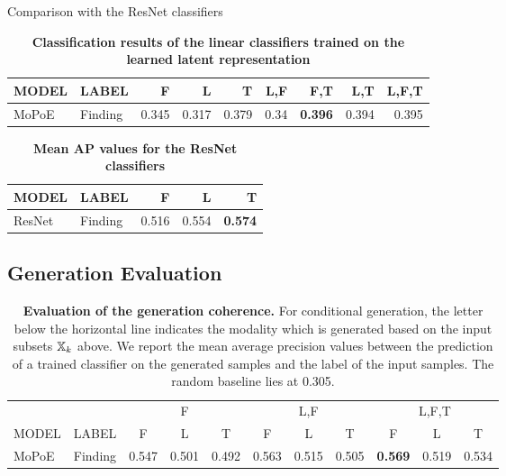     \begin{frame}{Comparison with the ResNet classifiers}
            \begin{table}
                \centering
            \begin{tabular}{llrrrrrrr}
            MODEL & LABEL &      F &      L &      T &   L,F &    F,T &    L,T &  L,F,T \\
            \midrule
            MoPoE & Finding &  0.345 &  0.317 &  0.379 &  0.34 &  \textbf{0.396} &  0.394 &  0.395 \\
            
            \end{tabular}
            \caption{\textbf{Classification results of the linear classifiers trained on the learned latent representation}}
            \end{table}
            
                        \begin{table}[]
                \centering
            \begin{tabular}{llrrr}
            MODEL & LABEL &      F &      L &      T       \\
            \midrule
            ResNet & Finding &  0.516 &  0.554 &  \textbf{0.574} \\
            \end{tabular}
            \caption{\textbf{Mean AP values for the ResNet classifiers}}
            \end{table}
    \end{frame}
    
    \subsection{Generation Evaluation}

    \begin{frame}
    \begin{table}[]
        \centering
\begin{tabular}{lcccccccccc}

      &         & \multicolumn{3}{c}{F} & \multicolumn{3}{c}{L,F} & \multicolumn{3}{c}{L,F,T} \\  \cmidrule(l){3-5} \cmidrule(l){6-8} \cmidrule(l){9-11} MODEL &    LABEL     &         F &         L &         T &         F &         L &         T &         F &         L &         T \\\midrule
MoPoE & Finding &  0.547 &  0.501 &  0.492 &  0.563 &  0.515 &  0.505 &  \textbf{0.569} &  0.519 &  0.534 
\end{tabular}
        \caption{\small{\textbf{Evaluation of the generation coherence.} For conditional generation, the letter below the horizontal line indicates the modality which is generated based on the input subsets $\mathbb{X} _k$ above. We report the mean average precision values between the prediction of a trained classifier on the generated samples and the label of the input samples. The random baseline lies at 0.305.}}
    \end{table}

    \end{frame}

